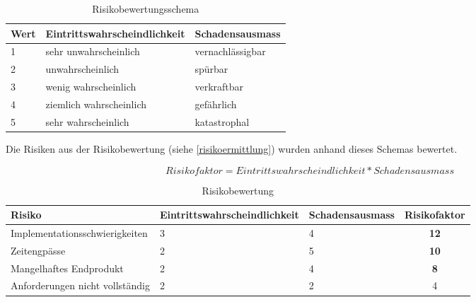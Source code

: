 \begin{table}[ht]
\centering
  \begin{tabular}{ l | p{5cm} | p{5cm} }
	\hline
	\rowcolor{gray}
	\textbf{Wert}					&	\textbf{Eintrittswahrscheindlichkeit} &	\textbf{Schadensausmass}	\\ \hline			
	1							&	sehr unwahrscheinlich		&	vernachlässigbar	\\ \hline
	2							&	unwahrscheinlich			&	spürbar		\\ \hline
	3							&	wenig wahrscheinlich		&	verkraftbar		\\ \hline
	4							&	ziemlich wahrscheinlich		&	gefährlich		\\ \hline
	5							&	sehr wahrscheinlich			&	katastrophal		\\ \hline
  \end{tabular}
   \caption{Risikobewertungsschema}
\end{table}

\FloatBarrier
Die Risiken aus der Risikobewertung (siehe \ref{risikoermittlung}) wurden anhand dieses Schemas bewertet.

\begin{equation*}
Risikofaktor = Eintrittswahrscheindlichkeit * Schadensausmass
\end{equation*}

\begin{table}[ht]
\centering
  \begin{tabular}{ l | p{4cm} | p{3cm} | c }
	\hline
	\rowcolor{gray}
	\textbf{Risiko}					&	\textbf{Eintrittswahrscheindlichkeit} &	\textbf{Schadensausmass} 	&	\textbf{Risikofaktor}\\ \hline			
	Implementationsschwierigkeiten			&	3					&	4			&	\textbf{12}	\\ \hline
	Zeitengpässe					&	2					&	5			&	\textbf{10}	\\ \hline
	Mangelhaftes Endprodukt				&	2					&	4			&	\textbf{8}	\\ \hline
	Anforderungen nicht vollständig			&	2					&	2			&	4		\\ \hline
  \end{tabular}
   \caption{Risikobewertung}
\end{table}

